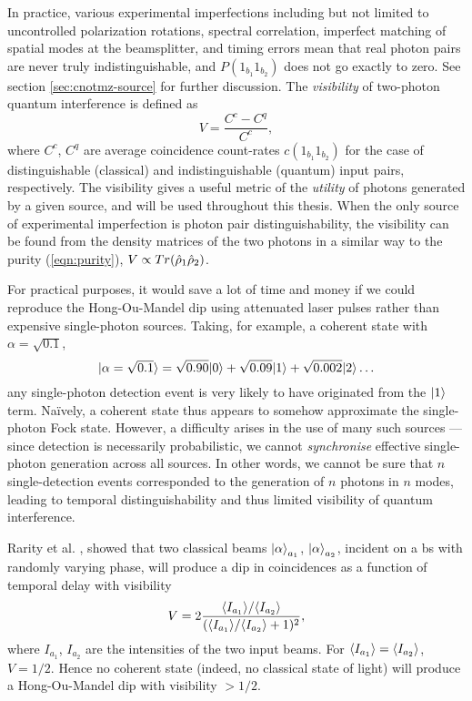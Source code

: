In practice, various experimental imperfections including but not limited to uncontrolled polarization rotations, spectral correlation, imperfect matching of spatial modes at the beamsplitter, and timing errors mean that real photon pairs are never truly indistinguishable, and $P(1_{b_1}1_{b_2})$ does not go exactly to zero. See section \ref{sec:cnotmz-source} for further discussion. The \emph{visibility} of two-photon quantum interference is defined as
\begin{equation}
    V=\frac{C^c - C^q}{C^c},
    \label{eqn:hom-dip-visibility}
\end{equation}
where $C^c$, $C^q$ are average coincidence count-rates $c(1_{b_1}1_{b_2})$ for the case of distinguishable (classical) and indistinguishable (quantum) input pairs, respectively. The visibility gives a useful metric of the \emph{utility} of photons generated by a given source, and will be used throughout this thesis. When the only source of experimental imperfection is photon pair distinguishability, the visibility can be found from the density matrices of the two photons in a similar way to the purity (\ref{eqn:purity}), $V\propto Tr(\hat{\rho}_1 \hat{\rho}_2)$. 

For practical purposes, it would save a lot of time and money if we could reproduce the Hong-Ou-Mandel dip using attenuated laser pulses rather than expensive single-photon sources. Taking, for example, a coherent state with $\alpha=\sqrt{0.1}$, 
\begin{equation}
    \mbox{$ | \alpha=\sqrt{0.1} \rangle $} = \sqrt{0.90}\mbox{$ | 0 \rangle $} + \sqrt{0.09}\mbox{$ | 1 \rangle $}  + \sqrt{0.002} \mbox{$ | 2 \rangle $} \ldots
\end{equation}
any single-photon detection event is very likely to have originated from the $\mbox{$ | 1 \rangle $}$ term. Na\"ively, a coherent state thus appears to somehow approximate the single-photon Fock state. However, a difficulty arises in the use of many such sources --- since  detection is necessarily probabilistic, we cannot \emph{synchronise} effective single-photon generation across all sources. In other words, we cannot be sure that $n$ single-detection events corresponded to the generation of $n$ photons in $n$ modes, leading to temporal distinguishability and thus limited visibility of quantum interference.

Rarity et al. \cite{Rarity1997}, showed that two classical beams $\mbox{$ | \alpha \rangle $}_{a_1}$, $\mbox{$ | \alpha \rangle $}_{a_2}$, incident on a \gls{bs} with randomly varying phase, will produce a dip in coincidences as a function of temporal delay with visibility
\begin{equation}
    V = 2\frac{\langle I_{a_1} \rangle/\langle I_{a_2} \rangle}{(\langle I_{a_1} \rangle/\langle I_{a_2} \rangle +1)^2},
\end{equation}
where $I_{a_1}$, $I_{a_2}$ are the intensities of the two input beams.
For $\langle I_{a_1} \rangle=\langle I_{a_2} \rangle$, $V=1/2$. Hence no coherent state (indeed, no classical state of light) will produce a Hong-Ou-Mandel dip with visibility $>1/2$.

